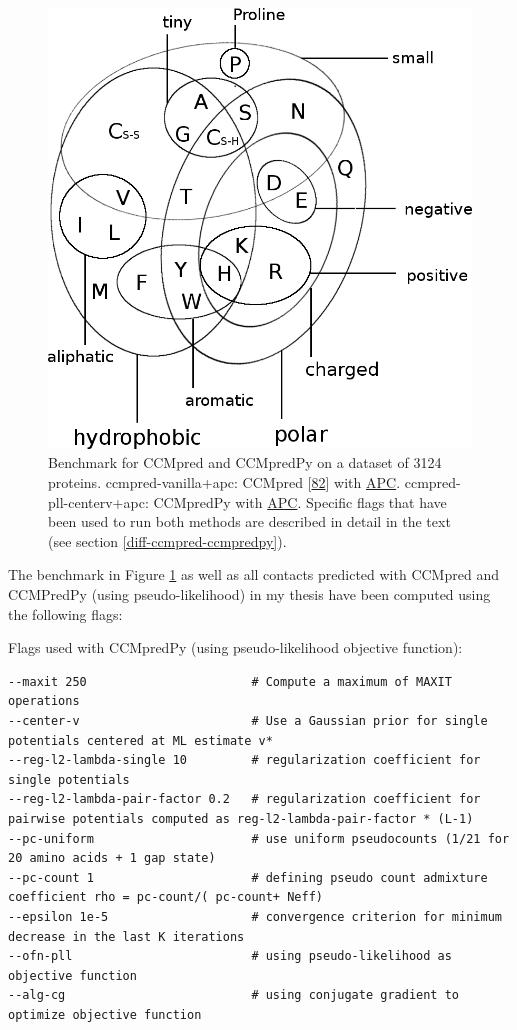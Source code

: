 \documentclass[12pt,a4paper,twoside]{book}
\theoremstyle{definition}
\theoremstyle{definition}
\theoremstyle{remark}
\begin{document}
\begin{figure}
\includegraphics[width=1\linewidth]{img/amino_acid_physico_chemical_properties_venn_diagramm} \caption{Benchmark for CCMpred and
CCMpredPy on a dataset of 3124 proteins. ccmpred-vanilla+apc: CCMpred
{[}\protect\hyperlink{ref-Seemayer2014}{82}{]} with
\protect\hyperlink{abbrev}{APC}. ccmpred-pll-centerv+apc: CCMpredPy with
\protect\hyperlink{abbrev}{APC}. Specific flags that have been used to
run both methods are described in detail in the text (see section
\ref{diff-ccmpred-ccmpredpy}).}\label{fig:cmmpredvanilla-vs-ccmpredpy}
\end{figure}

The benchmark in Figure \ref{fig:cmmpredvanilla-vs-ccmpredpy} as well as
all contacts predicted with CCMpred and CCMPredPy (using
pseudo-likelihood) in my thesis have been computed using the following
flags:

Flags used with CCMpredPy (using pseudo-likelihood objective function):

\begin{verbatim}
--maxit 250                       # Compute a maximum of MAXIT operations
--center-v                        # Use a Gaussian prior for single potentials centered at ML estimate v*
--reg-l2-lambda-single 10         # regularization coefficient for single potentials
--reg-l2-lambda-pair-factor 0.2   # regularization coefficient for pairwise potentials computed as reg-l2-lambda-pair-factor * (L-1)
--pc-uniform                      # use uniform pseudocounts (1/21 for 20 amino acids + 1 gap state) 
--pc-count 1                      # defining pseudo count admixture coefficient rho = pc-count/( pc-count+ Neff)
--epsilon 1e-5                    # convergence criterion for minimum decrease in the last K iterations
--ofn-pll                         # using pseudo-likelihood as objective function
--alg-cg                          # using conjugate gradient to optimize objective function
\end{verbatim}
\end{document}

